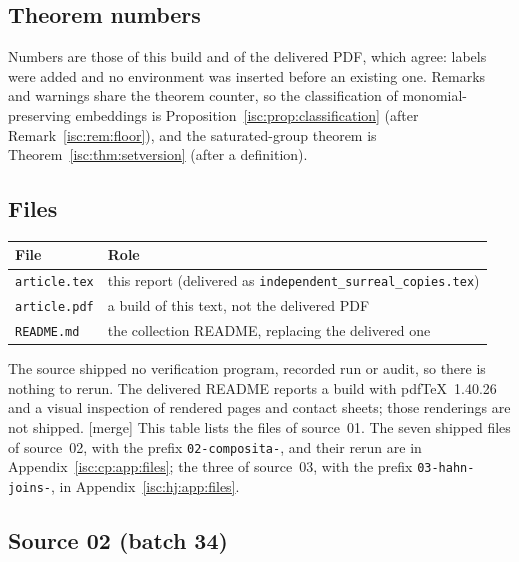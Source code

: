 \documentclass[11pt,letterpaper]{article}
\theoremstyle{definition}
\theoremstyle{remark}
\newcommand{\rpath}[1]{\nolinkurl{#1}}%
\newcommand{\mtag}{\textup{[merge]}}%
\numberwithin{equation}{section}
\begin{document}
\subsection{Theorem numbers}\label{isc:app:numbers}

Numbers are those of this build and of the delivered PDF, which agree:
labels were added and no environment was inserted before an existing one.
Remarks and warnings share the theorem counter, so the classification of
monomial-preserving embeddings is Proposition~\ref{isc:prop:classification}
(after Remark~\ref{isc:rem:floor}), and the saturated-group theorem is
Theorem~\ref{isc:thm:setversion} (after a definition).

\subsection{Files}\label{isc:app:files}

\begin{center}\small
\begin{tabular}{@{}ll@{}}
\toprule
File & Role \\
\midrule
\rpath{article.tex} & this report (delivered as \texttt{independent\_surreal\_copies.tex})\\
\rpath{article.pdf} & a build of this text, not the delivered PDF\\
\rpath{README.md} & the collection README, replacing the delivered one\\
\bottomrule
\end{tabular}
\end{center}

The source shipped no verification program, recorded run or audit, so
there is nothing to rerun. The delivered README reports a build with
pdfTeX~1.40.26 and a visual inspection of rendered pages and contact
sheets; those renderings are not shipped.
\mtag{} This table lists the files of source~01. The seven shipped files of
source~02, with the prefix \texttt{02-composita-}, and their rerun are in
Appendix~\ref{isc:cp:app:files}; the three of source~03, with the prefix
\texttt{03-hahn-joins-}, in Appendix~\ref{isc:hj:app:files}.

\subsection{Source 02 (batch 34)}\label{isc:cp:app:source}
\end{document}
